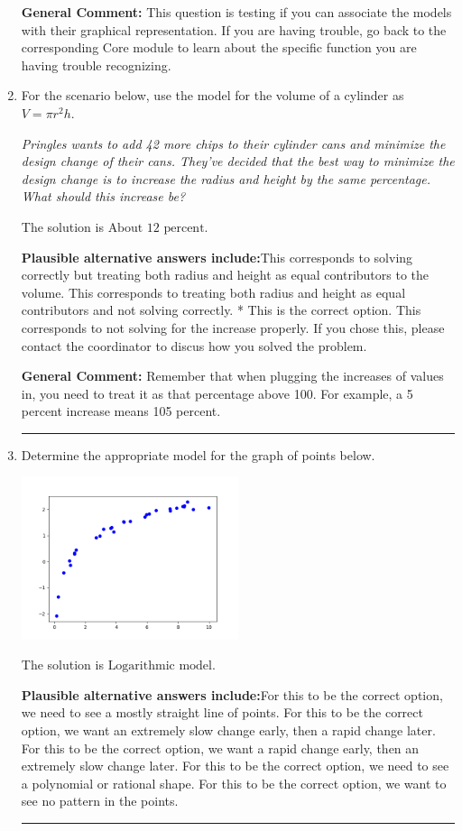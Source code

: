 \documentclass{extbook}[14pt]
\newcommand{\litem}[1]{\item #1

\rule{\textwidth}{0.4pt}}
\begin{document}
\begin{enumerate}
{\textbf{General Comment:} This question is testing if you can associate the models with their graphical representation. If you are having trouble, go back to the corresponding Core module to learn about the specific function you are having trouble recognizing.
}
\litem{
For the scenario below, use the model for the volume of a cylinder as $V = \pi r^2 h$.

\begin{center}
    \textit{ Pringles wants to add 42 \text{percent} more chips to their cylinder cans and minimize the design change of their cans. They've decided that the best way to minimize the design change is to increase the radius and height by the same percentage. What should this increase be? }
\end{center}
The solution is \( \text{About } 12 \text{ percent} \).\begin{enumerate}[label=\Alph*.]
\textbf{Plausible alternative answers include:}This corresponds to solving correctly but treating both radius and height as equal contributors to the volume.
This corresponds to treating both radius and height as equal contributors and not solving correctly.
* This is the correct option.
This corresponds to not solving for the increase properly.
If you chose this, please contact the coordinator to discus how you solved the problem.
\end{enumerate}

\textbf{General Comment:} Remember that when plugging the increases of values in, you need to treat it as that percentage above 100. For example, a 5 percent increase means 105 percent.
}
\litem{
Determine the appropriate model for the graph of points below.

\begin{center}
    \includegraphics[width=0.5\textwidth]{../Figures/identifyModelGraph12A.png}
\end{center}


The solution is \( \text{Logarithmic model} \).\begin{enumerate}[label=\Alph*.]
\textbf{Plausible alternative answers include:}For this to be the correct option, we need to see a mostly straight line of points.
For this to be the correct option, we want an extremely slow change early, then a rapid change later.
For this to be the correct option, we want a rapid change early, then an extremely slow change later.
For this to be the correct option, we need to see a polynomial or rational shape.
For this to be the correct option, we want to see no pattern in the points.
\end{enumerate}

}
\end{enumerate}
\end{document}
